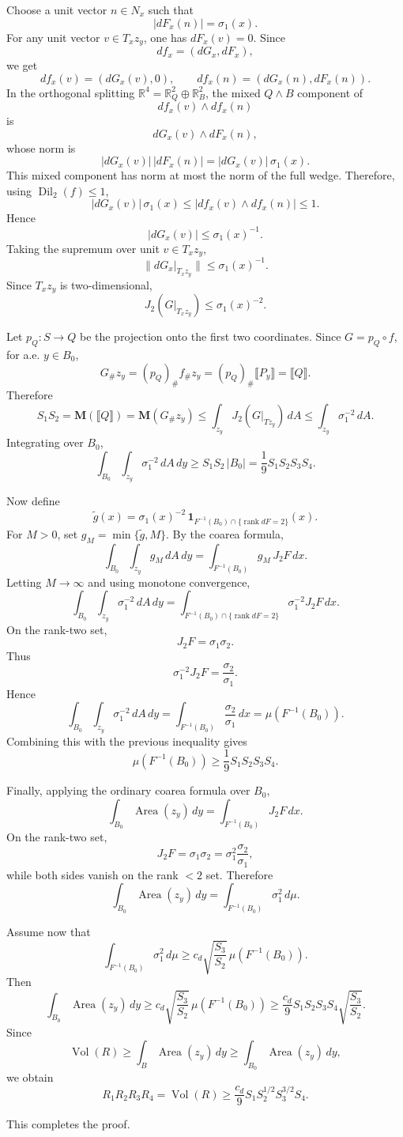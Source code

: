 \documentclass[12pt]{article}
\begin{document}
Choose a unit vector \(n\in N_x\) such that
\[
|dF_x(n)|=\sigma_1(x).
\]
For any unit vector \(v\in T_xz_y\), one has \(dF_x(v)=0\). Since
\[
df_x=(dG_x,dF_x),
\]
we get
\[
df_x(v)=(dG_x(v),0),
\qquad
df_x(n)=(dG_x(n),dF_x(n)).
\]
In the orthogonal splitting \(\mathbb R^4=\mathbb R^2_Q\oplus\mathbb R^2_B\), the mixed \(Q\wedge B\) component of
\[
df_x(v)\wedge df_x(n)
\]
is
\[
dG_x(v)\wedge dF_x(n),
\]
whose norm is
\[
|dG_x(v)|\,|dF_x(n)|
=
|dG_x(v)|\,\sigma_1(x).
\]
This mixed component has norm at most the norm of the full wedge. Therefore, using \(\operatorname{Dil}_2(f)\le 1\),
\[
|dG_x(v)|\,\sigma_1(x)
\le
|df_x(v)\wedge df_x(n)|
\le 1.
\]
Hence
\[
|dG_x(v)|\le \sigma_1(x)^{-1}.
\]
Taking the supremum over unit \(v\in T_xz_y\),
\[
\|dG_x|_{T_xz_y}\|\le \sigma_1(x)^{-1}.
\]
Since \(T_xz_y\) is two-dimensional,
\[
J_2(G|_{T_xz_y})\le \sigma_1(x)^{-2}.
\]

Let \(p_Q:S\to Q\) be the projection onto the first two coordinates. Since \(G=p_Q\circ f\), for a.e. \(y\in B_0\),
\[
G_\#z_y
=
(p_Q)_\# f_\#z_y
=
(p_Q)_\#\llbracket P_y\rrbracket
=
\llbracket Q\rrbracket.
\]
Therefore
\[
S_1S_2
=
\mathbf M(\llbracket Q\rrbracket)
=
\mathbf M(G_\#z_y)
\le
\int_{z_y}J_2(G|_{Tz_y})\,dA
\le
\int_{z_y}\sigma_1^{-2}\,dA.
\]
Integrating over \(B_0\),
\[
\int_{B_0}\int_{z_y}\sigma_1^{-2}\,dA\,dy
\ge
S_1S_2\,|B_0|
=
\frac19 S_1S_2S_3S_4.
\]

Now define
\[
\widetilde g(x)
=
\sigma_1(x)^{-2}\,
\mathbf 1_{F^{-1}(B_0)\cap\{\operatorname{rank}dF=2\}}(x).
\]
For \(M>0\), set \(g_M=\min\{\widetilde g,M\}\). By the coarea formula,
\[
\int_{B_0}\int_{z_y} g_M\,dA\,dy
=
\int_{F^{-1}(B_0)}g_M\,J_2F\,dx.
\]
Letting \(M\to\infty\) and using monotone convergence,
\[
\int_{B_0}\int_{z_y}\sigma_1^{-2}\,dA\,dy
=
\int_{F^{-1}(B_0)\cap\{\operatorname{rank}dF=2\}}
\sigma_1^{-2}J_2F\,dx.
\]
On the rank-two set,
\[
J_2F=\sigma_1\sigma_2.
\]
Thus
\[
\sigma_1^{-2}J_2F
=
\frac{\sigma_2}{\sigma_1}.
\]
Hence
\[
\int_{B_0}\int_{z_y}\sigma_1^{-2}\,dA\,dy
=
\int_{F^{-1}(B_0)}\frac{\sigma_2}{\sigma_1}\,dx
=
\mu(F^{-1}(B_0)).
\]
Combining this with the previous inequality gives
\[
\mu(F^{-1}(B_0))
\ge
\frac19 S_1S_2S_3S_4.
\]

Finally, applying the ordinary coarea formula over \(B_0\),
\[
\int_{B_0}\operatorname{Area}(z_y)\,dy
=
\int_{F^{-1}(B_0)}J_2F\,dx.
\]
On the rank-two set,
\[
J_2F=\sigma_1\sigma_2
=
\sigma_1^2\frac{\sigma_2}{\sigma_1},
\]
while both sides vanish on the rank \(<2\) set. Therefore
\[
\int_{B_0}\operatorname{Area}(z_y)\,dy
=
\int_{F^{-1}(B_0)}\sigma_1^2\,d\mu.
\]

Assume now that
\[
\int_{F^{-1}(B_0)}\sigma_1^2\,d\mu
\ge
c_d\sqrt{\frac{S_3}{S_2}}\,
\mu(F^{-1}(B_0)).
\]
Then
\[
\int_{B_0}\operatorname{Area}(z_y)\,dy
\ge
c_d\sqrt{\frac{S_3}{S_2}}\,
\mu(F^{-1}(B_0))
\ge
\frac{c_d}{9}
S_1S_2S_3S_4
\sqrt{\frac{S_3}{S_2}}.
\]
Since
\[
\operatorname{Vol}(R)
\ge
\int_B\operatorname{Area}(z_y)\,dy
\ge
\int_{B_0}\operatorname{Area}(z_y)\,dy,
\]
we obtain
\[
R_1R_2R_3R_4
=
\operatorname{Vol}(R)
\ge
\frac{c_d}{9}
S_1S_2^{1/2}S_3^{3/2}S_4.
\]

This completes the proof.
\end{document}
